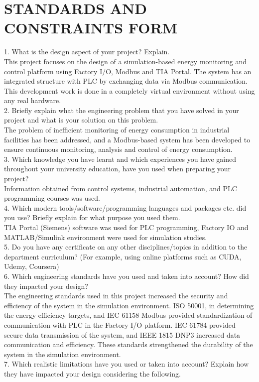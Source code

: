 \clearpage
\section*{STANDARDS AND CONSTRAINTS FORM}
\begin{flushleft}
1.	What is the design aspect of your project? Explain.\\
This project focuses on the design of a simulation-based energy monitoring and control platform using Factory I/O, Modbus and TIA Portal. The system has an integrated structure with PLC by exchanging data via Modbus communication. This development work is done in a completely virtual environment without using any real hardware.\\
2.	Briefly explain what the engineering problem that you have solved in your project and what is your solution on this problem.\\
The problem of inefficient monitoring of energy consumption in industrial facilities has been addressed, and a Modbus-based system has been developed to ensure continuous monitoring, analysis and control of energy consumption.\\
3.	Which knowledge you have learnt and which experiences you have gained throughout your university education, have you used when preparing your project?\\
Information obtained from control systems, industrial automation, and PLC programming courses was used.\\
4.	Which modern tools/software/programming languages and packages etc. did you use? Briefly explain for what purpose you used them.\\
TIA Portal (Siemens) software was used for PLC programming, Factory IO and MATLAB/Simulink environment were used for simulation studies.\\
5.	Do you have any certificate on any other disciplines/topics in addition to the department curriculum? (For example, using online platforms such as CUDA, Udemy, Coursera)\\
6.	Which engineering standards have you used and taken into account? How did they impacted your design?\\
The engineering standards used in this project increased the security and efficiency of the system in the simulation environment. ISO 50001, in determining the energy efficiency targets, and IEC 61158 Modbus provided standardization of communication with PLC in the Factory I/O platform. IEC 61784 provided secure data transmission of the system, and IEEE 1815 DNP3 increased data communication and efficiency. These standards strengthened the durability of the system in the simulation environment.\\
7.	Which realistic limitations have you used or taken into account? Explain how they have impacted your design considering the following.
\end{flushleft}
